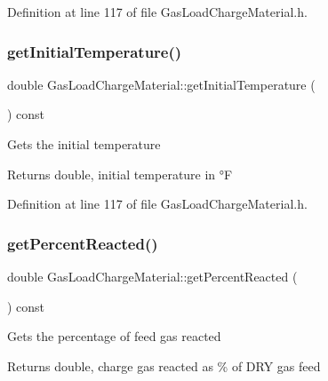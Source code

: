 Definition at line 117 of file Gas\+Load\+Charge\+Material.\+h.

\mbox{\label{class_gas_load_charge_material_af8a83c3720d108baa196394105822db7}} 
\subsubsection{\texorpdfstring{get\+Initial\+Temperature()}{getInitialTemperature()}\hspace{0.1cm}{\footnotesize\ttfamily [3/3]}}
{\footnotesize\ttfamily double Gas\+Load\+Charge\+Material\+::get\+Initial\+Temperature (\begin{DoxyParamCaption}{ }\end{DoxyParamCaption}) const\hspace{0.3cm}{\ttfamily [inline]}}

Gets the initial temperature \begin{DoxyReturn}{Returns}
double, initial temperature in °F 
\end{DoxyReturn}


Definition at line 117 of file Gas\+Load\+Charge\+Material.\+h.

\mbox{\label{class_gas_load_charge_material_af47b4c6c3e547325cadd81cbb09937ee}} 
\subsubsection{\texorpdfstring{get\+Percent\+Reacted()}{getPercentReacted()}\hspace{0.1cm}{\footnotesize\ttfamily [1/3]}}
{\footnotesize\ttfamily double Gas\+Load\+Charge\+Material\+::get\+Percent\+Reacted (\begin{DoxyParamCaption}{ }\end{DoxyParamCaption}) const\hspace{0.3cm}{\ttfamily [inline]}}

Gets the percentage of feed gas reacted \begin{DoxyReturn}{Returns}
double, charge gas reacted as \% of D\+RY gas feed 
\end{DoxyReturn}


